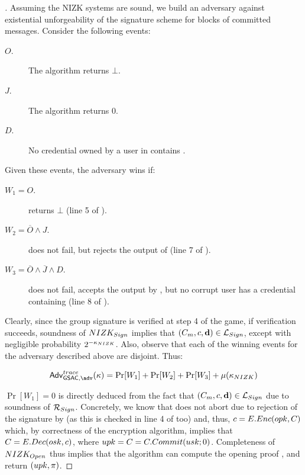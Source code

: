\begin{proof}[]
  Assuming the NIZK systems are sound, we build an adversary against existential
  unforgeability of the signature scheme for blocks of committed messages.
  Consider the following events:

  \begin{description}
  \item[$O$.] The \Open algorithm returns $\bot$.
  \item[$J$.] The \Judge algorithm returns $0$.
  \item[$D$.] No credential owned by a user in \CU contains \dattrs.
  \end{description}

  Given these events, the adversary wins if:

  \begin{description}
  \item[$W_1 = O$.] \Open returns $\bot$ (line 5 of \ExpGSACTrace).
  \item[$W_2 = \overline{O} \land J$.] \Open does not fail, but \Judge rejects
    the output of \Open (line 7 of \ExpGSACTrace).
  \item[$W_3 = \overline{O} \land \overline{J} \land D$.] \Open does not fail,
    \Judge accepts the output by \Open, but no corrupt user has a credential
    containing \dattrs (line 8 of \ExpGSACTrace).
  \end{description}

  Clearly, since the group signature is verified at step 4 of the game, if
  verification succeeds, soundness of $NIZK_{Sign}$ implies that $(C_m,
  c,\mathbf{d}) \in \mathcal{L}_{Sign}$, except with negligible probability
  $2^{-\kappa_{NIZK}}$. Also, observe that each of the winning events for the
  adversary described above are disjoint. Thus:

  \begin{equation}
    \AdvGSACTrace(\secpar) = \Pr[W_1]+\Pr[W_2]+\Pr[W_3]+\negl(\NIZKsecpar)
  \end{equation}

  $\Pr[W_1]=0$ is directly deduced from the fact that $(C_m,c,\mathbf{d})
  \in \mathcal{L}_{Sign}$ due to soundness of $\mathcal{R}_{Sign}$. Concretely,
  we know that \Open does not abort due to rejection of the signature by
  \Verify (as this is checked in line 4 of \ExpGSACTrace too) and, thus,
  $c = E.Enc(opk,C)$ which, by correctness of the encryption algorithm,
  implies that $C = E.Dec(osk,c)$, where $upk=C=C.Commit(usk;0)$.
  Completeness of $NIZK_{Open}$ thus implies that the \Open algorithm can
  compute the opening proof \oproof, and return $(upk,\pi)$.
  

\end{proof}
